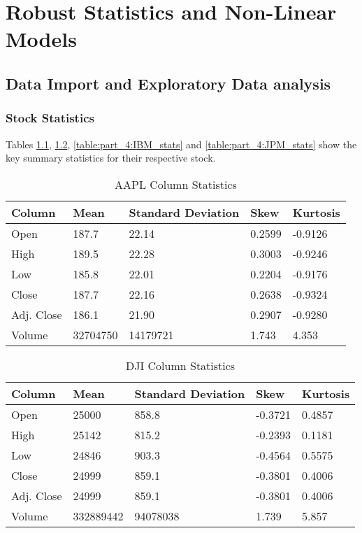 \chapter{Robust Statistics and Non-Linear Models}
\section{Data Import and Exploratory Data analysis}
\subsection{Stock Statistics}

Tables \ref{table:part_4:aapl_stats}, \ref{table:part_4:dji_stats}, \ref{table:part_4:IBM_stats} and \ref{table:part_4:JPM_stats} show the key summary statistics for their respective stock.
\begin{table}[h]
    \centering
    \begin{tabular}{l|l|l|l|l}
    Column     & Mean     & Standard Deviation  & Skew    & Kurtosis  \\ \hline
    Open       & 187.7    & 22.14               & 0.2599  & -0.9126   \\ 
    High       & 189.5    & 22.28               & 0.3003  & -0.9246  \\ 
    Low        & 185.8    & 22.01               & 0.2204  & -0.9176  \\ 
    Close      & 187.7    & 22.16               & 0.2638  & -0.9324  \\ 
    Adj. Close & 186.1    & 21.90               & 0.2907  & -0.9280  \\
    Volume     & 32704750 & 14179721            & 1.743   & 4.353   
    \end{tabular}
    \caption{AAPL Column Statistics}
    \label{table:part_4:aapl_stats}
\end{table}

\begin{table}[h]
    \centering
    \begin{tabular}{l|l|l|l|l}
    Column     & Mean     & Standard Deviation  & Skew    & Kurtosis  \\ \hline
    Open       & 25000    & 858.8               & -0.3721 & 0.4857   \\ 
    High       & 25142    & 815.2               & -0.2393 & 0.1181  \\ 
    Low        & 24846    & 903.3               & -0.4564 & 0.5575  \\ 
    Close      & 24999    & 859.1               & -0.3801 & 0.4006  \\ 
    Adj. Close & 24999    & 859.1               & -0.3801 & 0.4006 \\
    Volume     & 332889442 & 94078038           & 1.739  & 5.857   
    \end{tabular}
    \caption{DJI Column Statistics}
    \label{table:part_4:dji_stats}
\end{table}

